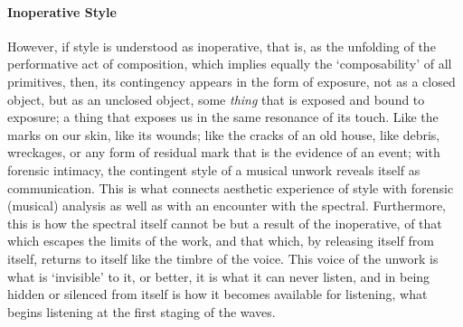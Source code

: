 \paragraph{Inoperative Style}
However, if style is understood as inoperative, that is, as the unfolding of the performative act of composition, which implies equally the `composability' of all primitives, then, its contingency appears in the form of exposure, not as a closed object, but as an unclosed object, some \textit{thing} that is exposed and bound to exposure; a thing that exposes us in the same resonance of its touch. Like the marks on our skin, like its wounds; like the cracks of an old house, like debris, wreckages, or any form of residual mark that is the evidence of an event; with forensic intimacy, the contingent style of a musical unwork reveals itself as communication. This is what connects aesthetic experience of style with forensic (musical) analysis as well as with an encounter with the spectral. Furthermore, this is how the spectral itself cannot be but a result of the inoperative, of that which escapes the limits of the work, and that which, by releasing itself from itself, returns to itself like the timbre of the voice. This voice of the unwork is what is `invisible' to it, or better, it is what it can never listen, and in being hidden or silenced from itself is how it becomes available for listening, what begins listening at the first staging of the waves.
